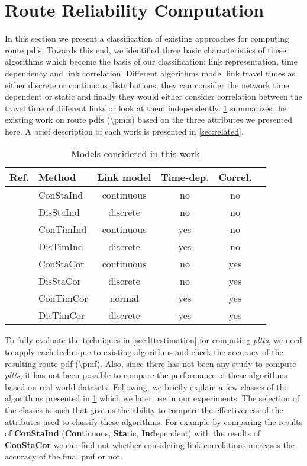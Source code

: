 \section{Route Reliability Computation}
\label{sec:methods}
In this section we present a classification of existing approaches for computing route pdfs. Towards this end, we identified three basic characteristics of these algorithms which become the basis of our classification; link representation, time dependency and link correlation. Different algorithms model link travel times as either discrete or continuous distributions, they can consider the network time dependent or static and finally they would either consider correlation between the travel time of different links or look at them independently. \cref{tab:methods} summarizes the existing work on route pdfs (\textbackslash pmfs) based on the three attributes we presented here. A brief description of each work is presented in \cref{sec:related}.

\begin{table}
\centering
\begin{tabular}{| l || l | c | c | c | c|}
\hline
Ref. & Method & Link model & Time-dep. & Correl. \\
\hline    \hline
\cite{Frank69} & ConStaInd & continuous  & no & no\\ \hline
               & DisStaInd & discrete & no & no\\ \hline
               & ConTimInd & continuous & yes & no\\ \hline
\cite{Miller-Hooks98,Miller-Hooks00, Nie09b} & DisTimInd & discrete & yes & no\\ \hline
\cite{Seshadri10, Zockaei13,Bi-Yu13} & ConStaCor & continuous & no & yes\\ \hline
\cite{Nie06,Hua10,Fan05} & DisStaCor & discrete & no & yes\\ \hline
\cite{Dong12} & ConTimCor & normal & yes & yes\\ \hline
\cite{Nie09a} & DisTimCor & discrete & yes & yes\\ \hline
\end{tabular}
\caption{Models considered in this work}
\label{tab:methods}
\end{table}

To fully evaluate the techniques in \cref{sec:lttestimation} for computing \textit{pltts}, we need to apply each technique to existing algorithms and check the accuracy of the resulting route pdf (\textbackslash pmf). Also, since there has not been any study to compute \textit{pltts}, it has not been possible to compare the performance of these algorithms based on real world datasets. Following, we briefly explain a few classes of the algorithms presented in \cref{tab:methods} which we later use in our experiments. The selection of the classes is such that give us the ability to compare the effectiveness of the attributes used to classify these algorithms. For example by comparing the results of \textbf{ConStaInd} (\textbf{Con}tinuous, \textbf{Sta}tic, \textbf{Ind}ependent) with the results of \textbf{ConStaCor} we can find out whether considering link correlations increases the accuracy of the final pmf or not.

